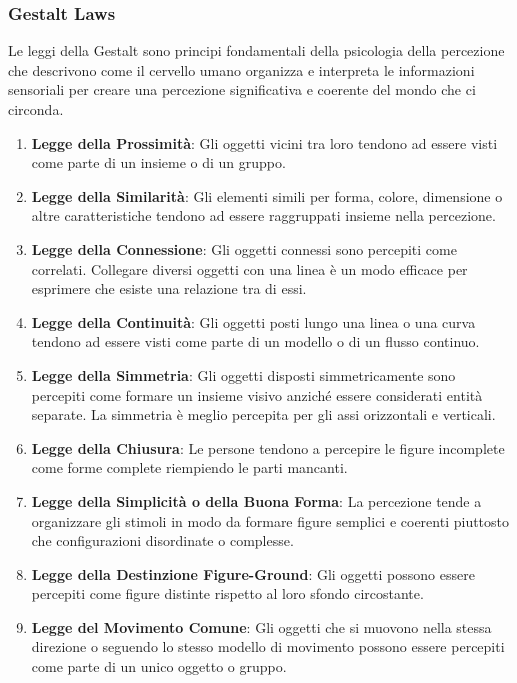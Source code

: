\subsubsection{Gestalt Laws}
Le leggi della Gestalt sono principi fondamentali della psicologia della percezione che descrivono come il cervello umano organizza e interpreta le informazioni sensoriali 
per creare una percezione significativa e coerente del mondo che ci circonda. 
\begin{enumerate}
    \item \textbf{Legge della Prossimità}: Gli oggetti vicini tra loro tendono ad essere visti come parte di un insieme o di un gruppo.
    
    \item \textbf{Legge della Similarità}: Gli elementi simili per forma, colore, dimensione o altre caratteristiche tendono ad essere raggruppati insieme nella percezione.
    
    \item \textbf{Legge della Connessione}: Gli oggetti connessi sono percepiti come correlati.
        Collegare diversi oggetti con una linea è un modo efficace per esprimere che esiste una relazione tra di essi.
    
    \item \textbf{Legge della Continuità}: Gli oggetti posti lungo una linea o una curva tendono ad essere visti come parte di un modello o di un flusso continuo.
    
    \item \textbf{Legge della Simmetria}: Gli oggetti disposti simmetricamente sono percepiti come formare un insieme visivo anziché essere considerati entità separate.
     La simmetria è meglio percepita per gli assi orizzontali e verticali.
    
    \item \textbf{Legge della Chiusura}: Le persone tendono a percepire le figure incomplete come forme complete riempiendo le parti mancanti.
    
    \item \textbf{Legge della Simplicità o della Buona Forma}: La percezione tende a organizzare gli stimoli in modo da formare figure semplici e coerenti piuttosto che configurazioni disordinate o complesse.
    
    \item \textbf{Legge della Destinzione Figure-Ground}: Gli oggetti possono essere percepiti come figure distinte rispetto al loro sfondo circostante.
    
    \item \textbf{Legge del Movimento Comune}: Gli oggetti che si muovono nella stessa direzione o seguendo lo stesso modello di movimento possono essere percepiti come parte di un unico oggetto o gruppo.
  \end{enumerate}
